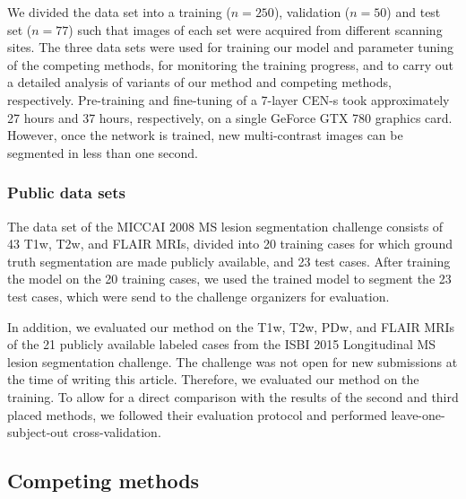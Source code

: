 
We divided the data set into a training ($n=250$), validation ($n=50$) and test
set ($n=77$) such that images of each set were acquired from different scanning
sites. The three data sets were used for training our model and parameter tuning
of the competing methods, for monitoring the training progress, and to carry out
a detailed analysis of variants of our method and competing methods,
respectively. Pre-training and fine-tuning of a 7-layer CEN-s took approximately
27 hours and 37 hours, respectively, on a single GeForce GTX 780 graphics card.
However, once the network is trained, new multi-contrast images can be segmented
in less than one second.

\subsubsection{Public data sets}
The data set of the MICCAI 2008 MS lesion segmentation challenge
\cite{styner20083d} consists of 43 T1w, T2w, and FLAIR MRIs, divided into 20
training cases for which ground truth segmentation are made publicly available,
and 23 test cases. After training the model on the 20 training cases, we used
the trained model to segment the 23 test cases, which were send to the challenge
organizers for evaluation.

In addition, we evaluated our method on the T1w, T2w, PDw, and FLAIR MRIs of the
21 publicly available labeled cases from the ISBI 2015 Longitudinal MS lesion
segmentation challenge. The challenge was not open for new submissions at the
time of writing this article. Therefore, we evaluated our method on the
training. To allow for a direct comparison with the results of the second and
third placed methods, we followed their evaluation protocol and performed
leave-one-subject-out cross-validation.

\subsection{Competing methods}

